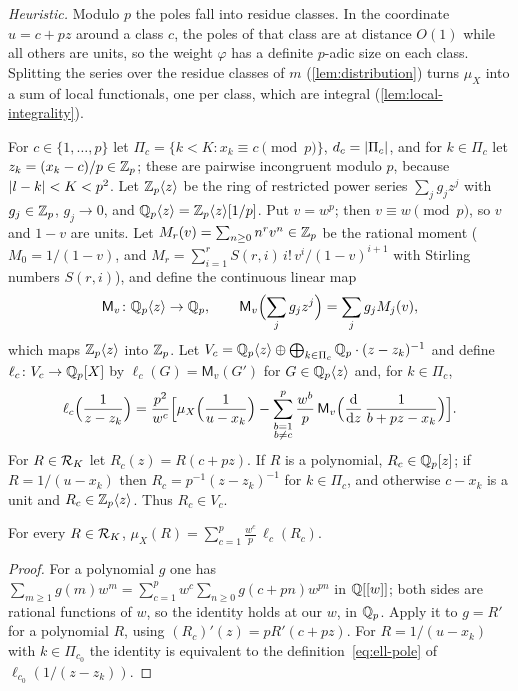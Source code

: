 \emph{Heuristic.} Modulo $p$ the poles fall into residue classes. In the coordinate $u=c+pz$
around a class $c$, the poles of that class are at distance $O(1)$ while all others are units,
so the weight $\varphi$ has a definite $p$-adic size on each class. Splitting the series over
the residue classes of $m$ (\cref{lem:distribution}) turns $\mu_X$ into a sum of local
functionals, one per class, which are integral (\cref{lem:local-integrality}).

For $c\in\{1,\dots,p\}$ let $\Pi_c=\{k<K:x_k\equiv c\pmod p\}$, $d_c=\left\lvert \Pi_c\right\rvert$, and for
$k\in\Pi_c$ let $z_k=(x_k-c)/p\in\mathbb{Z}_p$; these are pairwise incongruent modulo $p$, because
$\left\lvert l-k\right\rvert<K<p^2$. Let $\mathbb{Z}_p\langle z\rangle$ be the ring of restricted power series
$\sum_jg_jz^j$ with $g_j\in\mathbb{Z}_p$, $g_j\to0$, and $\mathbb{Q}_p\langle z\rangle=\mathbb{Z}_p\langle z\rangle[1/p]$. Put $v=w^p$;
then $v\equiv w\pmod p$, so $v$ and $1-v$ are units. Let $M_r(v)=\sum_{n\ge0}n^rv^n\in\mathbb{Z}_p$ be
the rational moment ($M_0=1/(1-v)$, and $M_r=\sum_{i=1}^r S(r,i)\,i!\,v^i/(1-v)^{i+1}$ with
Stirling numbers $S(r,i)$), and define the continuous linear map
\[
  \mathsf M_v\colon\mathbb{Q}_p\langle z\rangle\to\mathbb{Q}_p,\qquad \mathsf M_v\Bigl(\sum_jg_jz^j\Bigr)=\sum_jg_jM_j(v),
\]
which maps $\mathbb{Z}_p\langle z\rangle$ into $\mathbb{Z}_p$. Let $V_c=\mathbb{Q}_p\langle z\rangle\oplus\bigoplus_{k\in\Pi_c}\mathbb{Q}_p\cdot
(z-z_k)^{-1}$ and define $\ell_c\colon V_c\to\mathbb{Q}_p[X]$ by $\ell_c(G)=\mathsf M_v(G')$ for
$G\in\mathbb{Q}_p\langle z\rangle$ and, for $k\in\Pi_c$,
\begin{equation}\label{eq:ell-pole}
  \ell_c\Bigl(\frac1{z-z_k}\Bigr)=\frac{p^2}{w^c}\Bigl[\mu_X\Bigl(\frac1{u-x_k}\Bigr)
  -\sum_{\substack{b=1\\b\ne c}}^{p}\frac{w^b}{p}\,
  \mathsf M_v\Bigl(\frac{\mathrm d}{\mathrm dz}\,\frac{1}{b+pz-x_k}\Bigr)\Bigr].
\end{equation}
For $R\in\mathcal{R}_K$ let $R_c(z)=R(c+pz)$. If $R$ is a polynomial, $R_c\in\mathbb{Q}_p[z]$; if
$R=1/(u-x_k)$ then $R_c=p^{-1}(z-z_k)^{-1}$ for $k\in\Pi_c$, and otherwise $c-x_k$ is a unit and
$R_c\in\mathbb{Z}_p\langle z\rangle$. Thus $R_c\in V_c$.

\begin{lemma}\label{lem:distribution}
For every $R\in\mathcal{R}_K$, $\displaystyle\mu_X(R)=\sum_{c=1}^{p}\frac{w^c}{p}\,\ell_c(R_c)$.
\end{lemma}

\begin{proof}
For a polynomial $g$ one has $\sum_{m\ge1}g(m)w^m=\sum_{c=1}^pw^c\sum_{n\ge0}g(c+pn)w^{pn}$ in
$\mathbb{Q}[[w]]$; both sides are rational functions of $w$, so the identity holds at our $w$, in
$\mathbb{Q}_p$. Apply it to $g=R'$ for a polynomial $R$, using $(R_c)'(z)=pR'(c+pz)$. For
$R=1/(u-x_k)$ with $k\in\Pi_{c_0}$ the identity is equivalent to the definition~\eqref{eq:ell-pole}
of $\ell_{c_0}(1/(z-z_k))$.
\end{proof}

